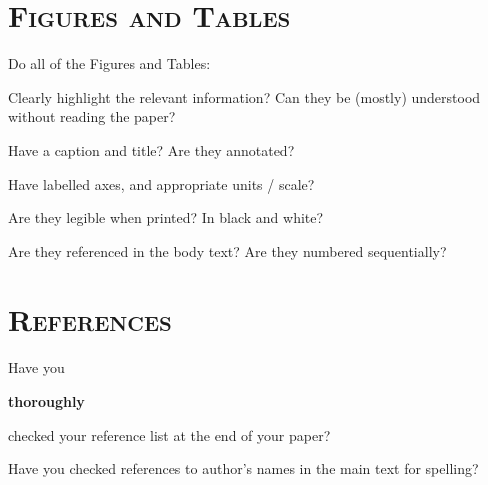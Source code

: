 \noindent\makebox[\linewidth]{\rule{\linewidth}{0.4pt}}
\section*{\textsc{Figures and Tables}}
\vspace{0.5cm}
Do all of the Figures and Tables:
\begin{checklist}
	\item Clearly highlight the relevant information? Can they be (mostly) understood without reading the paper? 
	\item Have a caption and title? Are they annotated? 
	\item Have labelled axes, and appropriate units / scale?
	\item Are they legible when printed? In black and white?
	\item Are they referenced in the body text? Are they numbered sequentially?
\end{checklist}











\section*{\textsc{References}}
\vspace{0.5cm}

\begin{checklist}
	\item Have you \begin{em}\textbf{thoroughly}\end{em} checked your reference list at the end of your paper?
	\item Have you checked references to author's names in the main text for spelling?
\end{checklist}

